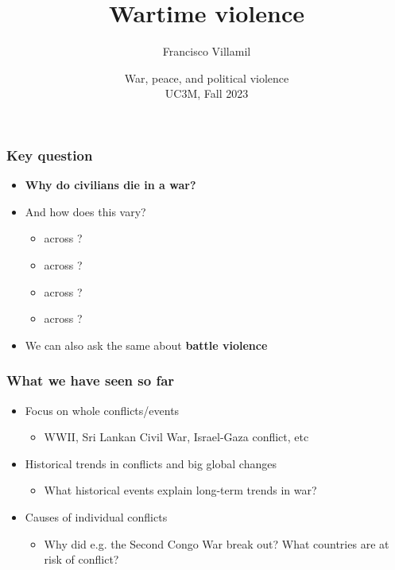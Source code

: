 \documentclass[aspectratio=43]{beamer}
\title{\huge Wartime violence}
\author{Francisco Villamil}
\date{War, peace, and political violence\\UC3M, Fall 2023}
\begin{document}
\begin{frame}
  \titlepage
\end{frame}





\begin{frame}
\frametitle{Key question}
\centering

\begin{itemize}[<+->]
  \item \textbf{Why do civilians die in a war?}
  \item And how does this vary?
  \begin{itemize}
    \item across ?
    \item across ?
    \item across ?
    \item across ?
  \end{itemize}
  \item We can also ask the same about \textbf{battle violence}
\end{itemize}



\end{frame}

\begin{frame}
\frametitle{What we have seen so far}
\centering

\begin{itemize}
  \item<1-> Focus on whole conflicts/events
  \begin{itemize}
    \item WWII, Sri Lankan Civil War, Israel-Gaza conflict, etc
  \end{itemize}
  \item<2-> Historical trends in conflicts and big global changes
  \begin{itemize}
    \item What historical events explain long-term trends in war?
  \end{itemize}
  \item<3-> Causes of individual conflicts
  \begin{itemize}
    \item Why did e.g. the Second Congo War break out? What countries are at risk of conflict?
  \end{itemize}
\end{itemize}

\end{frame}
\end{document}

